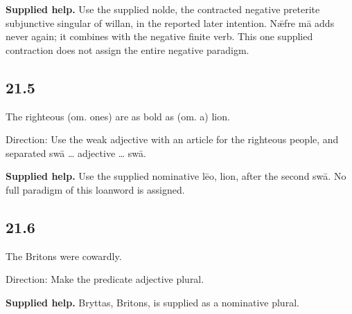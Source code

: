 \textbf{Supplied help.} Use the supplied nolde, the contracted negative preterite subjunctive singular of willan, in the reported later intention. Nǣfre mā adds never again; it combines with the negative finite verb. This one supplied contraction does not assign the entire negative paradigm.

\subsection*{21.5}

\par\begin{minipage}{\linewidth}\raggedright
The righteous (om. ones) are as bold as (om. a) lion.

Direction: Use the weak adjective with an article for the righteous people, and separated swā … adjective … swā.

\end{minipage}\par\addvspace{4pt}

\textbf{Supplied help.} Use the supplied nominative lēo, lion, after the second swā. No full paradigm of this loanword is assigned.

\subsection*{21.6}

\par\begin{minipage}{\linewidth}\raggedright
The Britons were cowardly.

Direction: Make the predicate adjective plural.

\end{minipage}\par\addvspace{4pt}

\textbf{Supplied help.} Bryttas, Britons, is supplied as a nominative plural.


